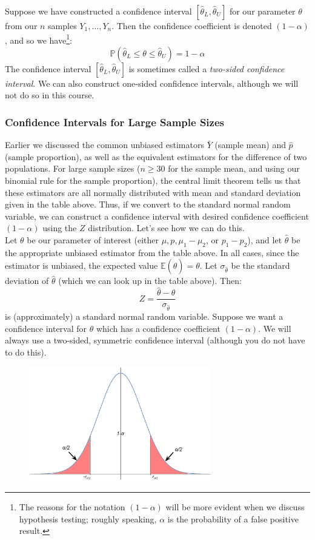 \documentclass[12pt]{article}
\theoremstyle{definition}
\theoremstyle{remark}
\def\P{{\mathbb P}}
\def\E{{\mathbb E}}
\begin{document}
Suppose we have constructed a confidence interval $[\hat{\theta}_L, \hat{\theta}_U]$ for our parameter $\theta$ from our $n$ samples $Y_1, \dots, Y_n$. Then the confidence coefficient is denoted $(1 - \alpha)$, and so we have\footnote{The reasons for the notation $(1 - \alpha)$ will be more evident when we discuss hypothesis testing; roughly speaking, $\alpha$ is the probability of a false positive result.}:
\[
\P(\hat{\theta}_L \leq \theta \leq \hat{\theta}_U) = 1 - \alpha
\]
The confidence interval $[\hat{\theta}_L, \hat{\theta}_U]$ is sometimes called a \emph{two-sided confidence interval}. We can also construct one-sided confidence intervals, although we will not do so in this course.

\subsubsection{Confidence Intervals for Large Sample Sizes}
Earlier we discussed the common unbiased estimators $\bar{Y}$ (sample mean) and $\hat{p}$ (sample proportion), as well as the equivalent estimators for the difference of two populations. For large sample sizes ($n \geq 30$ for the sample mean, and using our binomial rule for the sample proportion), the central limit theorem tells us that these estimators are all normally distributed with mean and standard deviation given in the table above. Thus, if we convert to the standard normal random variable, we can construct a confidence interval with desired confidence coefficient $(1 - \alpha)$ using the $Z$ distribution. Let's see how we can do this.\\

Let $\theta$ be our parameter of interest (either $\mu, p, \mu_1 - \mu_2$, or $p_1 - p_2$), and let $\hat{\theta}$ be the appropriate unbiased estimator from the table above. In all cases, since the estimator is unbiased, the expected value $\E(\hat{\theta}) = \theta$. Let $\sigma_{\hat{\theta}}$ be the standard deviation of $\hat{\theta}$ (which we can look up in the table above). Then:
\[
Z = \frac{\hat{\theta} - \theta}{\sigma_{\hat{\theta}}}
\]
is (approximately) a standard normal random variable. Suppose we want a confidence interval for $\theta$ which has a confidence coefficient $(1 - \alpha)$. We will always use a two-sided, symmetric confidence interval (although you do not have to do this).
\begin{figure}[H]
\centering
\includegraphics[width=8cm]{confidenceinterval.eps}
\end{figure}
\end{document}
